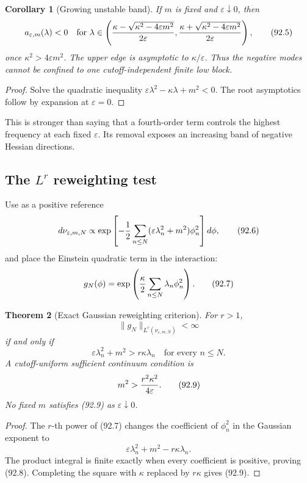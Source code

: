 \documentclass[11pt]{article}
\newtheorem{theorem}{Theorem}[section]
\newtheorem{corollary}[theorem]{Corollary}
\begin{document}
\begin{corollary}[Growing unstable band]
\label{cor:v11v92-band}
If \(m\) is fixed and \(\varepsilon\downarrow0\), then
\[
 a_{\varepsilon,m}(\lambda)<0
 \quad\text{for }\lambda\in
 \left(
 {\kappa-\sqrt{\kappa^2-4\varepsilon m^2}\over2\varepsilon},
 {\kappa+\sqrt{\kappa^2-4\varepsilon m^2}\over2\varepsilon}
 \right),                                                    \tag{92.5}
\]
once \(\kappa^2>4\varepsilon m^2\).  The upper edge is asymptotic to
\(\kappa/\varepsilon\).  Thus the negative modes cannot be confined
to one cutoff-independent finite low block.
\end{corollary}

\begin{proof}
Solve the quadratic inequality
\(\varepsilon\lambda^2-\kappa\lambda+m^2<0\).  The root asymptotics
follow by expansion at \(\varepsilon=0\).
\end{proof}

This is stronger than saying that a fourth-order term controls the
highest frequency at each fixed \(\varepsilon\).  Its removal exposes
an increasing band of negative Hessian directions.

\subsection{The \(L^r\) reweighting test}

Use as a positive reference
\[
 d\nu_{\varepsilon,m,N}
 \propto\exp\left[
 -{1\over2}\sum_{n\le N}
       (\varepsilon\lambda_n^2+m^2)\phi_n^2\right]d\phi,     \tag{92.6}
\]
and place the Einstein quadratic term in the interaction:
\[
                         g_N(\phi)
 =\exp\left({\kappa\over2}
             \sum_{n\le N}\lambda_n\phi_n^2\right).          \tag{92.7}
\]

\begin{theorem}[Exact Gaussian reweighting criterion]
\label{thm:v11v92-Lr}
For \(r>1\),
\[
 \|g_N\|_{L^r(\nu_{\varepsilon,m,N})}<\infty
\]
if and only if
\[
                         \varepsilon\lambda_n^2+m^2
                         >r\kappa\lambda_n
                    \quad\text{for every }n\le N.           \tag{92.8}
\]
A cutoff-uniform sufficient continuum condition is
\[
                         m^2>{r^2\kappa^2\over4\varepsilon}. \tag{92.9}
\]
No fixed \(m\) satisfies (92.9) as
\(\varepsilon\downarrow0\).
\end{theorem}

\begin{proof}
The \(r\)-th power of (92.7) changes the coefficient of \(\phi_n^2\)
in the Gaussian exponent to
\[
                         \varepsilon\lambda_n^2+m^2
                               -r\kappa\lambda_n.
\]
The product integral is finite exactly when every coefficient is
positive, proving (92.8).  Completing the square with
\(\kappa\) replaced by \(r\kappa\) gives (92.9).
\end{proof}
\end{document}
